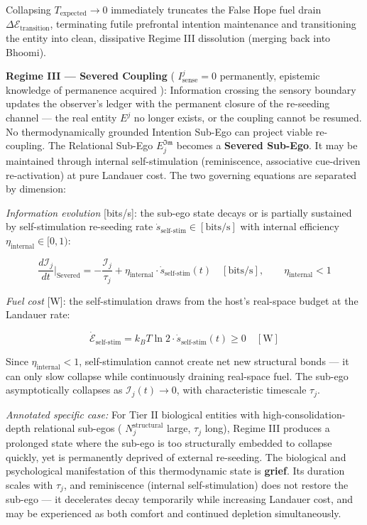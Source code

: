 \documentclass[11pt,a4paper]{article}
\theoremstyle{definition}
\theoremstyle{remark}
\begin{document}
Collapsing $T_{\text{expected}} \to 0$ immediately truncates the False Hope fuel drain $\Delta\mathcal{E}_{\text{transition}}$, terminating futile prefrontal intention maintenance and transitioning the entity into clean, dissipative Regime III dissolution (merging back into Bhoomi).

\textbf{Regime III — Severed Coupling} ( $I_{\text{sense}}^j = 0$ permanently, epistemic knowledge of permanence acquired ): Information crossing the sensory boundary updates the observer's ledger with the permanent closure of the re-seeding channel — the real entity $E^j$ no longer exists, or the coupling cannot be resumed. No thermodynamically grounded Intention Sub-Ego can project viable re-coupling. The Relational Sub-Ego $E_j^{\mathfrak{Im}}$ becomes a \textbf{Severed Sub-Ego}. It may be maintained through internal self-stimulation (reminiscence, associative cue-driven re-activation) at pure Landauer cost. The two governing equations are separated by dimension:

\textit{Information evolution} [bits/s]: the sub-ego state decays or is partially sustained by self-stimulation re-seeding rate $\dot{s}_{\text{self-stim}} \in [\text{bits/s}]$ with internal efficiency $\eta_{\text{internal}} \in [0, 1)$:


\begin{equation}
\boxed{\frac{d\mathcal{I}_j}{dt}\Bigg|_{\text{Severed}} = -\frac{\mathcal{I}_j}{\tau_j} + \eta_{\text{internal}} \cdot \dot{s}_{\text{self-stim}}(t) \quad [\text{bits/s}], \qquad \eta_{\text{internal}} < 1}
\end{equation}


\textit{Fuel cost} [W]: the self-stimulation draws from the host's real-space budget at the Landauer rate:


\begin{equation}
\boxed{\dot{\mathcal{E}}_{\text{self-stim}} = k_B T \ln 2 \cdot \dot{s}_{\text{self-stim}}(t) \geq 0 \quad [\text{W}]}
\end{equation}


Since $\eta_{\text{internal}} < 1$, self-stimulation cannot create net new structural bonds — it can only slow collapse while continuously draining real-space fuel. The sub-ego asymptotically collapses as $\mathcal{I}_j(t) \to 0$, with characteristic timescale $\tau_j$.

\textit{Annotated specific case:} For Tier II biological entities with high-consolidation-depth relational sub-egos ( $N_j^{\text{structural}}$ large, $\tau_j$ long), Regime III produces a prolonged state where the sub-ego is too structurally embedded to collapse quickly, yet is permanently deprived of external re-seeding. The biological and psychological manifestation of this thermodynamic state is \textbf{grief}. Its duration scales with $\tau_j$, and reminiscence (internal self-stimulation) does not restore the sub-ego — it decelerates decay temporarily while increasing Landauer cost, and may be experienced as both comfort and continued depletion simultaneously.
\end{document}
